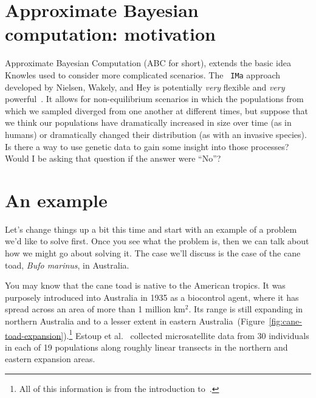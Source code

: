 \section*{Approximate Bayesian computation: motivation}

Approximate Bayesian Computation (ABC for short), extends the basic
idea Knowles used to consider more complicated scenarios. The {\tt
  IMa} approach developed by Nielsen, Wakely, and Hey is potentially
{\it very\/} flexible and {\it very\/}
powerful~\cite{Hey-Nielsen-2004,Hey-Nielsen-2007,Nielsen-Wakeley-2001}. It
allows for non-equilibrium scenarios in which the populations from
which we sampled diverged from one another at different times, but
suppose that we think our populations have dramatically increased in
size over time (as in humans) or dramatically changed their
distribution (as with an invasive species). Is there a way to use
genetic data to gain some insight into those processes? Would I be
asking that question if the answer were ``No''?

\section*{An example}

Let's change things up a bit this time and start with an example of a
problem we'd like to solve first. Once you see what the problem is,
then we can talk about how we might go about solving it. The case
we'll discuss is the case of the cane toad, {\it Bufo marinus}, in
Australia.

You may know that the cane toad is native to the American tropics. It
was purposely introduced into Australia in 1935 as a biocontrol agent,
where it has spread across an area of more than 1 million km$^2$. Its
range is still expanding in northern Australia and to a lesser extent
in eastern
Australia~(Figure~\ref{fig:cane-toad-expansion}).\footnote{All of this
  information is from the introduction to~\cite{Estoup-etal-2004}.}
Estoup et al.~\cite{Estoup-etal-2004} collected microsatellite data
from 30 individuals in each of 19 populations along roughly linear
transects in the northern and eastern expansion areas.

